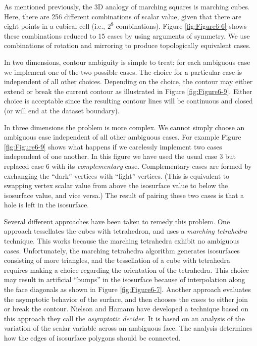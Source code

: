 As mentioned previously, the 3D analogy of marching squares is marching cubes. Here, there are 256 different combinations of scalar value, given that there are eight points in a cubical cell (i.e., $2^8$ combinations). Figure \ref{fig:Figure6-6} shows these combinations reduced to 15 cases by using arguments of symmetry. We use combinations of rotation and mirroring to produce topologically equivalent cases.

In two dimensions, contour ambiguity is simple to treat: for each ambiguous case we implement one of the two possible cases. The choice for a particular case is independent of all other choices. Depending on the choice, the contour may either extend or break the current contour as illustrated in Figure \ref{fig:Figure6-9}. Either choice is acceptable since the resulting contour lines will be continuous and closed (or will end at the dataset boundary).

In three dimensions the problem is more complex. We cannot simply choose an ambiguous case independent of all other ambiguous cases. For example Figure \ref{fig:Figure6-9} shows what happens if we carelessly implement two cases independent of one another. In this figure we have used the usual case 3 but replaced case 6 with its \emph{complementary} case. Complementary cases are formed by exchanging the ``dark'' vertices with ``light'' vertices. (This is equivalent to swapping vertex scalar value from above the isosurface value to below the isosurface value, and vice versa.) The result of pairing these two cases is that a hole is left in the isosurface.

Several different approaches have been taken to remedy this problem. One approach tessellates the cubes with tetrahedron, and uses a \emph{marching tetrahedra} technique. This works because the marching tetrahedra exhibit no ambiguous cases. Unfortunately, the marching tetrahedra algorithm generates isosurfaces consisting of more triangles, and the tessellation of a cube with tetrahedra requires making a choice regarding the orientation of the tetrahedra. This choice may result in artificial ``bumps'' in the isosurface because of interpolation along the face diagonals as shown in Figure \ref{fig:Figure6-7}. Another approach evaluates the asymptotic behavior of the surface, and then chooses the cases to either join or break the contour. Nielson and Hamann \cite{Nielson91} have developed a technique based on this approach they call the \emph{asymptotic decider}. It is based on an analysis of the variation of the scalar variable across an ambiguous face. The analysis determines how the edges of isosurface polygons should be connected.

